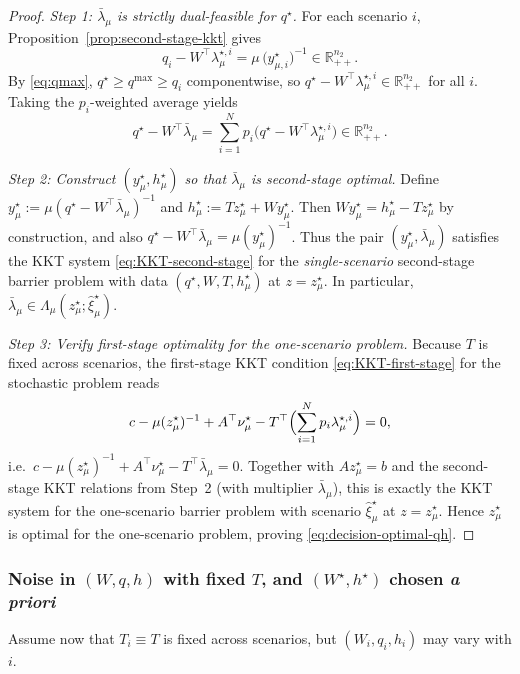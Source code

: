 \documentclass[11pt]{article}
\theoremstyle{plain}
\theoremstyle{definition}
\theoremstyle{remark}
\begin{document}
\begin{proof}
\emph{Step 1: $\bar\lambda_\mu$ is strictly dual-feasible for $q^\star$.}
For each scenario $i$, Proposition~\ref{prop:second-stage-kkt} gives
\[
q_i-W^\top\lambda_{\mu}^{\star,i}=\mu\,\bigl(y_{\mu,i}^\star\bigr)^{-1}\in\mathbb{R}^{n_2}_{++}.
\]
By \eqref{eq:qmax}, $q^\star\ge q^{\max}\ge q_i$ componentwise, so
$q^\star-W^\top\lambda_{\mu}^{\star,i}\in\mathbb{R}^{n_2}_{++}$ for all $i$.
Taking the $p_i$-weighted average yields
\[
q^\star-W^\top\bar\lambda_\mu
=\sum_{i=1}^N p_i\bigl(q^\star-W^\top\lambda_{\mu}^{\star,i}\bigr)\in\mathbb{R}^{n_2}_{++}.
\]

\emph{Step 2: Construct $(y_\mu^\star,h_\mu^\star)$ so that $\bar\lambda_\mu$ is second-stage optimal.}
Define $y_\mu^\star:=\mu(q^\star-W^\top\bar\lambda_\mu)^{-1}$ and $h_\mu^\star:=Tz_\mu^\star+Wy_\mu^\star$.
Then $Wy_\mu^\star=h_\mu^\star-Tz_\mu^\star$ by construction, and also
$q^\star-W^\top\bar\lambda_\mu=\mu(y_\mu^\star)^{-1}$.
Thus the pair $(y_\mu^\star,\bar\lambda_\mu)$ satisfies the KKT system \eqref{eq:KKT-second-stage}
for the \emph{single-scenario} second-stage barrier problem with data $(q^\star,W,T,h_\mu^\star)$ at $z=z_\mu^\star$.
In particular, $\bar\lambda_\mu\in\Lambda_\mu(z_\mu^\star;\hat\xi_\mu^\star)$.

\emph{Step 3: Verify first-stage optimality for the one-scenario problem.}
Because $T$ is fixed across scenarios, the first-stage KKT condition \eqref{eq:KKT-first-stage} for the
stochastic problem reads
\[
c-\mu(z_\mu^\star)^{-1}+A^\top\nu_\mu^\star - T^\top\Bigl(\sum_{i=1}^N p_i\lambda_{\mu}^{\star,i}\Bigr)=0,
\]
i.e.\ $c-\mu(z_\mu^\star)^{-1}+A^\top\nu_\mu^\star-T^\top\bar\lambda_\mu=0$.
Together with $Az_\mu^\star=b$ and the second-stage KKT relations from Step~2 (with multiplier
$\bar\lambda_\mu$), this is exactly the KKT system for the one-scenario barrier problem with scenario
$\hat\xi_\mu^\star$ at $z=z_\mu^\star$. Hence $z_\mu^\star$ is optimal for the one-scenario problem,
proving \eqref{eq:decision-optimal-qh}.
\end{proof}

\subsubsection[Noise in (W,q,h) with fixed T, and (W*, h*) chosen a priori]{Noise in $(W,q,h)$ with fixed $T$, and $(W^\star,h^\star)$ chosen \emph{a priori}}\label{subsec:Wqh-fixedT}

Assume now that $T_i\equiv T$ is fixed across scenarios, but $(W_i,q_i,h_i)$ may vary with $i$.
\end{document}
